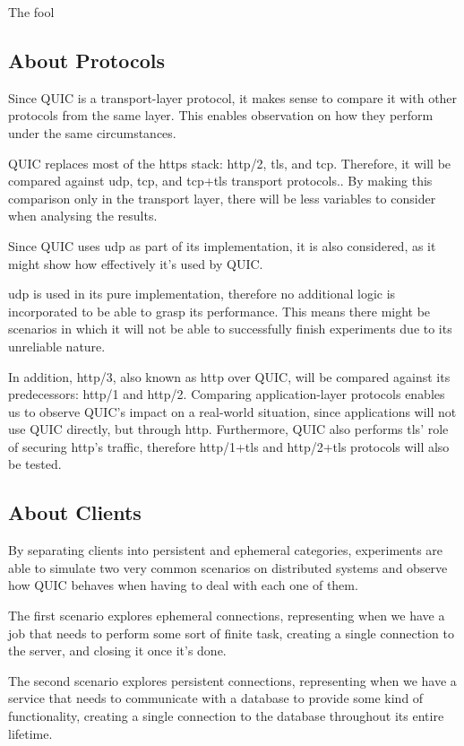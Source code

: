 The fool

\subsection{About Protocols}

Since QUIC is a transport-layer protocol, it makes sense to compare it with other protocols from the same layer. This enables observation on how they perform under the same circumstances.

QUIC replaces most of the \gls{https} stack: \gls{http}/2, \gls{tls}, and \gls{tcp}. Therefore, it will be compared against \gls{udp}, \gls{tcp}, and \gls{tcp}+\gls{tls} transport protocols.. By making this comparison only in the transport layer, there will be less variables to consider when analysing the results.

Since QUIC uses \gls{udp} as part of its implementation, it is also considered, as it might show how effectively it’s used by QUIC.

\gls{udp} is used in its pure implementation, therefore no additional logic is incorporated to be able to grasp its performance. This means there might be scenarios in which it will not be able to successfully finish experiments due to its unreliable nature.

In addition, \gls{http}/3, also known as \gls{http} over QUIC, will be compared against its predecessors: \gls{http}/1 and \gls{http}/2. Comparing application-layer protocols enables us to observe QUIC’s impact on a real-world situation, since applications will not use QUIC directly, but through \gls{http}. Furthermore, QUIC also performs \gls{tls}’ role of securing \gls{http}’s traffic, therefore \gls{http}/1+\gls{tls} and \gls{http}/2+\gls{tls} protocols will also be tested.

\subsection{About Clients}

By separating clients into persistent and ephemeral categories, experiments are able to simulate two very common scenarios on distributed systems and observe how QUIC behaves when having to deal with each one of them.

The first scenario explores ephemeral connections, representing when we have a job that needs to perform some sort of finite task, creating a single connection to the server, and closing it once it’s done.

The second scenario explores persistent connections, representing when we have a service that needs to communicate with a database to provide some kind of functionality, creating a single connection to the database throughout its entire lifetime.

